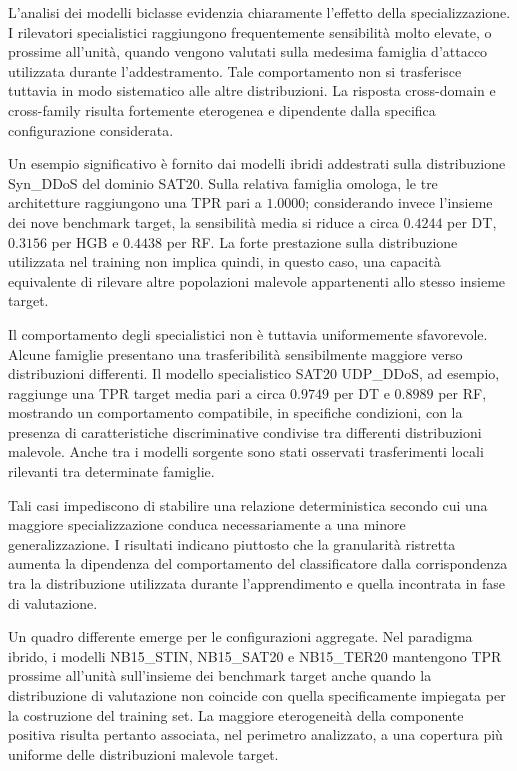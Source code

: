 L'analisi dei modelli biclasse evidenzia chiaramente l'effetto della specializzazione.
I rilevatori specialistici raggiungono frequentemente sensibilità molto elevate, o prossime all'unità, quando vengono valutati sulla medesima famiglia d'attacco utilizzata durante l'addestramento.
Tale comportamento non si trasferisce tuttavia in modo sistematico alle altre distribuzioni.
La risposta cross-domain e cross-family risulta fortemente eterogenea e dipendente dalla specifica configurazione considerata.

Un esempio significativo è fornito dai modelli ibridi addestrati sulla distribuzione Syn\_DDoS del dominio SAT20.
Sulla relativa famiglia omologa, le tre architetture raggiungono una TPR pari a $1.0000$; considerando invece l'insieme dei nove benchmark target, la sensibilità media si riduce a circa $0.4244$ per DT, $0.3156$ per HGB e $0.4438$ per RF.
La forte prestazione sulla distribuzione utilizzata nel training non implica quindi, in questo caso, una capacità equivalente di rilevare altre popolazioni malevole appartenenti allo stesso insieme target.

Il comportamento degli specialistici non è tuttavia uniformemente sfavorevole.
Alcune famiglie presentano una trasferibilità sensibilmente maggiore verso distribuzioni differenti.
Il modello specialistico SAT20 UDP\_DDoS, ad esempio, raggiunge una TPR target media pari a circa $0.9749$ per DT e $0.8989$ per RF, mostrando un comportamento compatibile, in specifiche condizioni, con la presenza di caratteristiche discriminative condivise tra differenti distribuzioni malevole.
Anche tra i modelli sorgente sono stati osservati trasferimenti locali rilevanti tra determinate famiglie.

Tali casi impediscono di stabilire una relazione deterministica secondo cui una maggiore specializzazione conduca necessariamente a una minore generalizzazione.
I risultati indicano piuttosto che la granularità ristretta aumenta la dipendenza del comportamento del classificatore dalla corrispondenza tra la distribuzione utilizzata durante l'apprendimento e quella incontrata in fase di valutazione.

Un quadro differente emerge per le configurazioni aggregate.
Nel paradigma ibrido, i modelli NB15\_STIN, NB15\_SAT20 e NB15\_TER20 mantengono TPR prossime all'unità sull'insieme dei benchmark target anche quando la distribuzione di valutazione non coincide con quella specificamente impiegata per la costruzione del training set.
La maggiore eterogeneità della componente positiva risulta pertanto associata, nel perimetro analizzato, a una copertura più uniforme delle distribuzioni malevole target.

